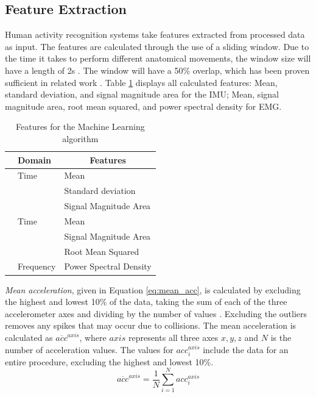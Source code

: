 \subsection{Feature Extraction}
\label{sec:Approach:Feature-Extraction}
Human activity recognition systems take features extracted from processed data as input. The features are calculated through the use of a sliding window. Due to the time it takes to perform different anatomical movements, the window size will have a length of 2s \cite{Dorfmeister2014}. The window will have a 50\% overlap, which has been proven sufficient in related work \cite{Wannenburg2016}. Table \ref{tab:features} displays all calculated features: Mean, standard deviation, and signal magnitude area for the IMU; Mean, signal magnitude area, root mean squared, and power spectral density for EMG.
\begin{table}[h]
	\centering
	\begin{tabular}{c|l|l}
		& \multicolumn{1}{l|}{Domain} & \multicolumn{1}{c}{Features} \\
		\hline
		\parbox[t]{2mm}{} & Time & Mean\\
		&& Standard deviation\\
		&& Signal Magnitude Area\\
		\hline
		\parbox[t]{2mm}{} & Time & Mean\\
		&& Signal Magnitude Area \\
		&& Root Mean Squared \\
		& Frequency & Power Spectral Density \\
	\end{tabular}
	\caption{Features for the Machine Learning algorithm}
	\label{tab:features}
\end{table}
\emph{Mean acceleration}, given in Equation \ref{eq:mean_acc}, is calculated by excluding the highest and lowest 10\% of the data, taking the sum of each of the three accelerometer axes and dividing by the number of values \cite{Totty2017}. Excluding the outliers removes any spikes that may occur due to collisions. The mean acceleration is calculated as $ \overline{acc}^{axis} $, where $axis$ represents all three axes $x,y,z$ and $N$ is the number of acceleration values. The values for $acc^{axis}_i$ include the data for an entire procedure, excluding the highest and lowest 10\%.
\begin{equation}\label{eq:mean_acc}
\overline{acc}^{axis} = \frac{1}{N}\sum_{i=1}^{N}acc^{axis}_i
\end{equation}
